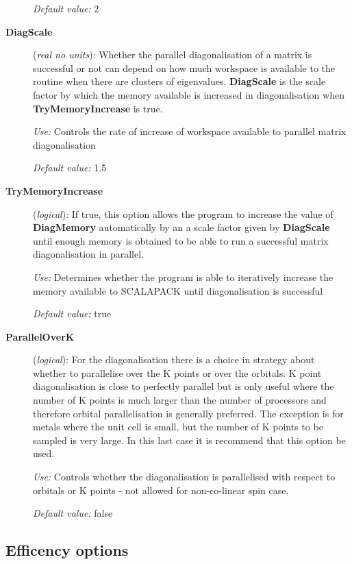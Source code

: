 \begin{description}
{\it Default value:}  2

\item[{\bf DiagScale}] ({\it real no units}):
Whether the parallel diagonalisation of a matrix is successful or not can
depend on how much workspace is available to the routine when there are
clusters of eigenvalues. {\bf DiagScale} is the scale factor by which
the memory available is increased in diagonalisation when {\bf TryMemoryIncrease} 
is true.

{\it Use:} Controls the rate of increase of workspace available to parallel matrix diagonalisation

{\it Default value:}  1.5

\item[{\bf TryMemoryIncrease}] ({\it logical}):
If true, this option allows the program to increase the value of {\bf DiagMemory}
automatically by an a scale factor given by {\bf DiagScale} until enough memory is 
obtained to be able to run a successful matrix diagonalisation in parallel.

{\it Use:} Determines whether the program is able to iteratively increase the
  memory available to SCALAPACK until diagonalisation is successful

{\it Default value:}  true

\item[{\bf ParallelOverK}] ({\it logical}):
For the diagonalisation there is a choice in strategy about whether to parallelise
over the K points or over the orbitals. K point diagonalisation is close to
perfectly parallel but is only useful where the number of K points is much 
larger than the number of processors and therefore orbital parallelisation
is generally preferred. The exception is for metals where the unit cell is
small, but the number of K points to be sampled is very large. In this last
case it is recommend that this option be used.

{\it Use:} Controls whether the diagonalisation is parallelised with respect
  to orbitals or K points - not allowed for non-co-linear spin case.

{\it Default value:}  false

\end{description}


\vspace{5pt}
\subsection{Efficency options}

